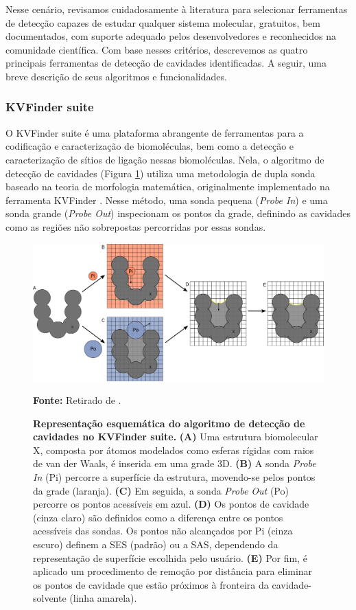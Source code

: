 \documentclass[Portugues]{phdquali}
\begin{document}
Nesse cenário, revisamos cuidadosamente à literatura para selecionar ferramentas de detecção capazes de estudar qualquer sistema molecular, gratuitos, bem documentados, com suporte adequado pelos desenvolvedores e reconhecidos na comunidade científica. Com base nesses critérios, descrevemos as quatro principais ferramentas de detecção de cavidades identificadas. A seguir, uma breve descrição de seus algoritmos e funcionalidades.

\subsubsection{KVFinder suite}

O KVFinder suite é uma plataforma abrangente de ferramentas para a codificação e caracterização de biomoléculas, bem como a detecção e caracterização de sítios de ligação nessas biomoléculas. Nela, o algoritmo de detecção de cavidades (Figura \ref{fig:kvfinder-suite-schema}) utiliza uma metodologia de dupla sonda baseado na teoria de morfologia matemática, originalmente implementado na ferramenta KVFinder \cite{oliveira2014}. Nesse método, uma sonda pequena (\textit{Probe In}) e uma sonda grande (\textit{Probe Out}) inspecionam os pontos da grade, definindo as cavidades como as regiões não sobrepostas percorridas por essas sondas. 

\begin{figure}[ht]
  \centerline{\includegraphics[scale=0.65]{images/kvfinder-suite-schema.png}}
  \centerline{\scriptsize{\textbf{Fonte:} Retirado de \cite{guerra2023B}.}}
  \caption[Representação esquemática do algoritmo de detecção de cavidades no KVFinder suite]{\textbf{Representação esquemática do algoritmo de detecção de cavidades no KVFinder suite.} \textbf{(A)} Uma estrutura biomolecular X, composta por átomos modelados como esferas rígidas com raios de van der Waals, é inserida em uma grade 3D. \textbf{(B)} A sonda \textit{Probe In} (Pi) percorre a superfície da estrutura, movendo-se pelos pontos da grade (laranja). \textbf{(C)} Em seguida, a sonda \textit{Probe Out} (Po) percorre os pontos acessíveis em azul. \textbf{(D)} Os pontos de cavidade (cinza claro) são definidos como a diferença entre os pontos acessíveis das sondas. Os pontos não alcançados por Pi (cinza escuro) definem a SES (padrão) ou a SAS, dependendo da representação de superfície escolhida pelo usuário. \textbf{(E)} Por fim, é aplicado um procedimento de remoção por distância para eliminar os pontos de cavidade que estão próximos à fronteira da cavidade-solvente (linha amarela).}
  \label{fig:kvfinder-suite-schema}
\end{figure}
\end{document}

